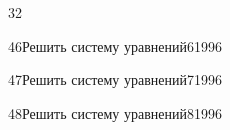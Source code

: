 \begin{TrigSourcePage}{32}
\begin{TrigExercise}{46}{Решить систему уравнений}{6}{1996}
\end{TrigExercise}
\begin{TrigExercise}{47}{Решить систему уравнений}{7}{1996}
\end{TrigExercise}
\begin{TrigExercise}{48}{Решить систему уравнений}{8}{1996}
\end{TrigExercise}
\end{TrigSourcePage}

